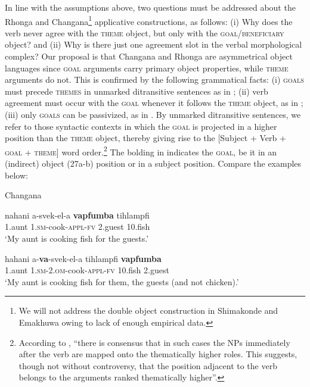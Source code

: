 \documentclass[output=paper]{langsci/langscibook}
\begin{document}
In line with the assumptions above, {two questions must be addressed about the Rhonga and Changana}\footnote{ {We will not address the double object construction in Shimakonde and Emakhuwa owing to lack of enough empirical data. }} {applicative constructions, as follows: (i) Why does the verb never agree with the }{\textsc{theme}} {object, but only with the }{\textsc{goal}}{/}{\textsc{beneficiary}} {object? and (ii) Why is there just one agreement slot in the verbal morphological complex? }Our proposal is that Changana and Rhonga are asymmetrical object languages since \textsc{goal} arguments carry primary object properties, while \textsc{theme} arguments do not. This is confirmed by the following grammatical facts: (i) \textsc{goals} must precede \textsc{themes} in unmarked ditransitive sentences as in ; (ii) verb agreement must occur with the \textsc{goal} whenever it follows the \textsc{theme} object, as in ; (iii) only \textsc{goals} can be passivized, as in . By unmarked ditransitive sentences, we refer to those syntactic contexts in which the \textsc{goal} is projected in a higher position than the \textsc{theme} object, thereby giving rise to the [Subject + Verb + \textsc{goal} + \textsc{theme}] word order.\footnote{ {According to \citet[111]{Chimbutane2002}, “there is consensus that in such cases the NPs immediately after the verb are mapped onto the thematically higher roles. This suggests, though not without controversy, that the position adjacent to the verb belongs to the arguments ranked thematically higher”.}} The bolding in  indicates the \textsc{goal}, be it in an (indirect) object (27a-b) position or in a subject  position. Compare the examples below:

{Changana}

\ea
\gll nahani       a-svek-el-a                  \textbf{vapfumba}       tihlampfi\\
     1.aunt        1.\textsc{sm}{}-cook-\textsc{appl-fv}     2.guest            10.fish\\
\glt ‘My aunt is cooking fish for the guests.’
\z

\ea
\gll hahani       a-\textbf{va}{}-svek-el-a                       tihlampfi         \textbf{vapfumba}\\
     1.aunt        \textsc{1.sm-2.om}{}-cook-\textsc{appl}{}-\textsc{fv}     10.fish             2.guest\\
\glt ‘My aunt is cooking fish for them, the guests (and not chicken).’
\z
\end{document}
